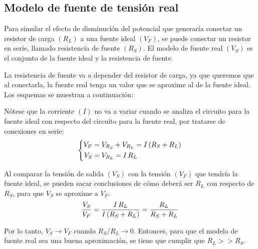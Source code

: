 \documentclass[a5paper,12pt,twoside]{book}
\begin{document}
\subsection*{Modelo de fuente de tensión real}

Para simular el efecto de disminución del potencial que generaría conectar un resistor de carga $(R_L)$ a una fuente ideal $(V_F)$, se puede conectar un resistor en serie, llamado resistencia de fuente $(R_S)$. El modelo de fuente real $(V_S)$ es el conjunto de la fuente ideal y la resistencia de fuente.

La resistencia de fuente va a depender del resistor de carga, ya que queremos que al conectarla, la fuente real tenga un valor que se aproxime al de la fuente ideal. Los esquemas se muestran a continuación:

\begin{multicols}{2}
    \begin{center}
        \def\svgwidth{0.9\linewidth}
        
    \end{center}
    \begin{center}
        \def\svgwidth{0.9\linewidth}
        
    \end{center}
\end{multicols}

Nótese que la corriente $(I)$ no va a variar cuando se analiza el circuito para la fuente ideal con respecto del circuito para la fuente real, por tratarse de conexiones en serie:
\begin{equation*}
    \left\{
    \begin{aligned}
        V_F &= V_{R_S} + V_{R_L} = I \left(R_S + R_L\right)
        \\
        V_S &= V_{R_L} = I \, R_L
    \end{aligned}
    \right.
\end{equation*}

Al comparar la tensión de salida $(V_S)$ con la tensión $(V_F)$ que tendría la fuente ideal, se pueden sacar conclusiones de cómo deberá ser $R_L$ con respecto de $R_S$, para que $V_S$ se aproxime a $V_F$.
\begin{equation*}
    \frac{V_S}{V_F} = \frac{I \, R_L}{I \left(R_S + R_L\right)} = \frac{R_L}{R_S + R_L}
\end{equation*}

Por lo tanto, $V_S \to V_F$ cuando $R_S / R_L \to 0$. Entonces, para que el modelo de fuente real sea una buena aproximación, se tiene que cumplir que $R_L >> R_S$.
\end{document}
